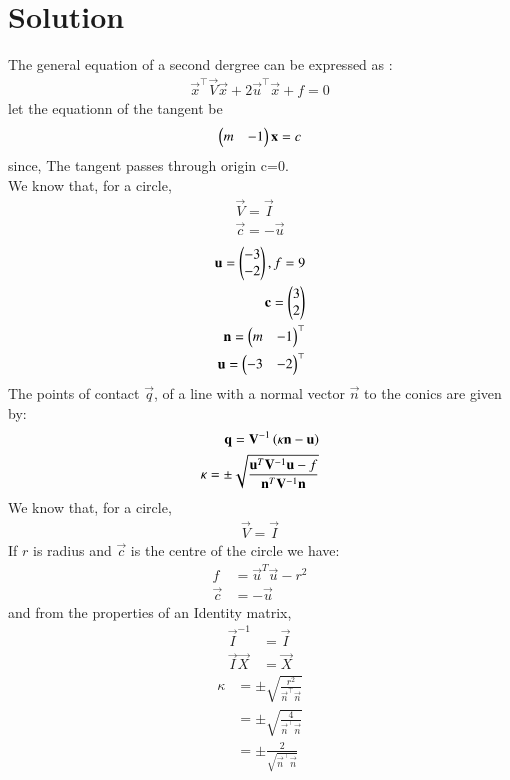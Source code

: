 \documentclass[journal,12pt,twocolumn]{IEEEtran}
\begin{document}
\section{Solution}
The general equation of a second dergree can be expressed as :
\begin{align}
    \vec{x}^\top\vec{V}\vec{x}+2\vec{u}^\top\vec{x} + f = 0 
\end{align}
let the equationn of the tangent be
\begin{align}
    \begin{pmatrix}m & -1\end{pmatrix}\mathbf{x} = c 
\end{align}
since, The tangent passes through origin c=0.\\
We know that, for a circle,
\begin{align}
    \vec{V} = \vec{I}\\
    \vec{c} = -\vec{u}
\end{align}
\begin{align}
   \mathbf{u} = \begin{pmatrix}-3 \\ -2\end{pmatrix}, f=9\\
   \mathbf{c}=\begin{pmatrix}3 \\ 2\end{pmatrix}\\
    \mathbf{n} = \begin{pmatrix}m & -1\end{pmatrix}^\top \label{eq}\\ \mathbf{u}=\begin{pmatrix}-3 &-2\end{pmatrix}^\top 
\end{align}
The points of contact $\vec{q}$, of a line with a normal vector $\vec{n}$ to the conics are given by:
\begin{align}
\mathbf{q} = \mathbf{V}^{-1}\left(\kappa \mathbf{n}-\mathbf{u}\right) \label{eq:9} \\
\kappa = \pm \sqrt{\frac{\mathbf{u}^T\mathbf{V}^{-1}\mathbf{u}-f}{\mathbf{n}^T\mathbf{V}^{-1}\mathbf{n}}}\label{eq:10}
\end{align}
We know that, for a circle, 
\begin{align}
\vec{V} = \vec{I}\label{eq:11}  
\end{align}
If $r$ is radius and $\vec{c}$ is the centre of the circle we have:
\begin{align}
f &=\vec{u}^T\vec{u}-r^2  \label{eq:5} \\  
\vec{c} &=-\vec{u}
\end{align}
and from the properties of an Identity matrix, 
\begin{align}
\vec{I}^{-1} &= \vec{I} \\
\vec{I}\vec{X} &= \vec{X}   
\end{align}
\begin{align}
\kappa &= \pm \sqrt{\frac{r^2}{\vec{n}^{\top}\vec{n}}} \\
&= \pm \sqrt{\frac{4}{\vec{n}^{\top}\vec{n}}} \\
& =  \pm \frac{2}{\sqrt{\vec{n}^{\top}\vec{n}}}
\end{align}
\end{document}
